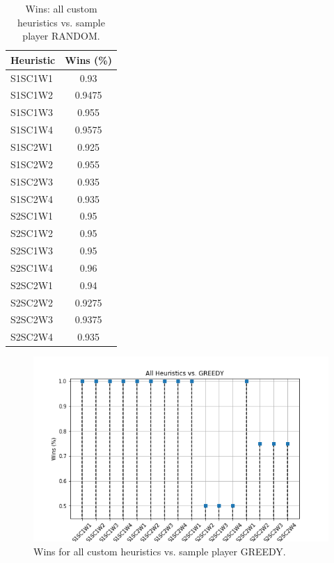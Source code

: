 \documentclass[a4paper]{article}
\begin{document}
    \begin{table}[htpb]
    \caption{ Wins: all custom heuristics vs. sample player RANDOM.}
    \centering
    \begin{tabular}{ l | c }
    Heuristic & Wins (\%) \\ \hline 
    S1SC1W1 & 0.93 \\
    S1SC1W2 & 0.9475 \\
    S1SC1W3 & 0.955 \\
    S1SC1W4 & 0.9575 \\
    S1SC2W1 & 0.925 \\
    S1SC2W2 & 0.955 \\
    S1SC2W3 & 0.935 \\
    S1SC2W4 & 0.935 \\
    S2SC1W1 & 0.95 \\
    S2SC1W2 & 0.95 \\
    S2SC1W3 & 0.95 \\
    S2SC1W4 & 0.96 \\
    S2SC2W1 & 0.94 \\
    S2SC2W2 & 0.9275 \\
    S2SC2W3 & 0.9375 \\
    S2SC2W4 & 0.935 
    \end{tabular}
    \label{tabwinsRANDOM}
    \end{table}

    


\begin{figure}[htpb]
\begin{center}
\includegraphics[width=1\columnwidth]{fig/results_Wins_All_vs_GREEDY.png}
\caption{Wins for all custom heuristics vs. sample player GREEDY.}
\end{center}
\label{figwinsGREEDY}
\end{figure}
    
\end{document}
